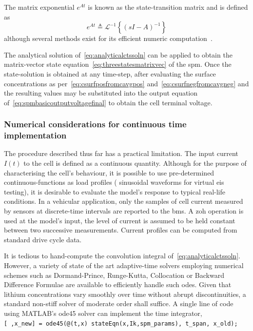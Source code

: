 The matrix exponential $e^{At}$ is known as the state-transition matrix and is
defined as
\begin{equation}
    e^{A t} ≜ \mathcal{L}^{-1}\left\{(s I - A)^{-1}\right\}
\end{equation}
although several methods exist for its efficient numeric
computation~\cite{Moler2003}.

The  analytical  solution  of~\cref{eq:analyticalctssoln}   can  be  applied  to
obtain  the matrix-vector  state equation~\cref{eq:threestatesmatrixvec}  of the
\gls{spm}.  Once  the  state-solution  is   obtained  at  any  time-step,  after
evaluating  the  surface   concentrations  as  per~\cref{eq:csurfposfromcavgpos}
and~\cref{eq:csurfnegfromcavgneg} and  the resulting  values may  be substituted
into the  output equation of~\cref{eq:spmbasicoutputvoltagefinal} to  obtain the
cell terminal voltage.

\subsubsection*{Numerical considerations for continuous time implementation}

The procedure described  thus far has a practical limitation.  The input current
$I(t)$ to the cell is defined as a continuous quantity. Although for the purpose
of characterising  the cell's  behaviour, it is  possible to  use pre-determined
continuous-functions as  load profiles  (\eg{} sinusoidal waveforms  for virtual
\gls{eis} testing), it is desirable to  evaluate the model's response to typical
real-life  conditions. In  a vehicular  application,  only the  samples of  cell
current  measured by  sensors at  discrete-time  intervals are  reported to  the
\gls{bms}. A \gls{zoh}  operation is used at the model's  input, \ie{} the level
of current is  assumed to be held constant between  two successive measurements.
Current profiles can be computed from standard drive cycle data.

It     is    tedious     to     hand-compute     the    convolution     integral
of~\cref{eq:analyticalctssoln}.  However,   a  variety  of  state   of  the  art
adaptive-time  solvers  employing  numerical  schemes  such  as  Dormand-Prince,
Runge-Kutta,  Collocation  or  Backward  Difference Formulae  are  available  to
efficiently  handle  such \gls{ode}s.  Given  that  lithium concentrations  vary
smoothly over time  without abrupt discontinuities, a  standard non-stiff solver
of moderate order  shall suffice. A single line of code  using MATLAB's ode45
solver can implement the time integrator, \eg{} \\ \texttt{[~,x_new] =
ode45(@(t,x) stateEqn(x,Ik,spm_params), t_span, x_old); }


